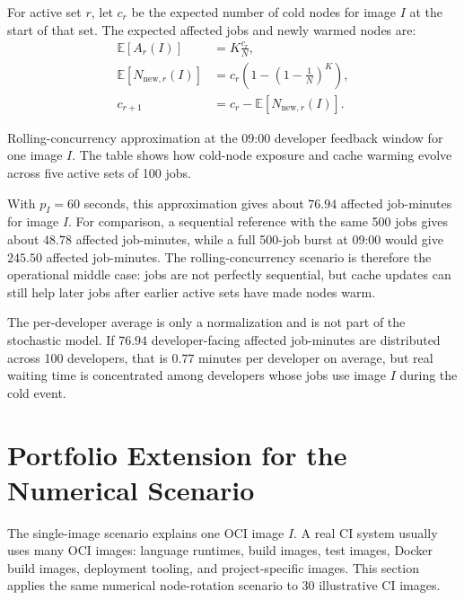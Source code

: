 \documentclass[11pt,a4paper]{article}
\newcommand{\E}{\mathbb{E}}
\begin{document}
For active set \(r\), let \(c_r\) be the expected number of cold nodes for image \(I\) at the start of that set. The expected affected jobs and newly warmed nodes are:
\begin{align}
  \E[A_r(I)] &= K\frac{c_r}{N},\\
  \E[N_{\mathrm{new},r}(I)] &= c_r\left(1-\left(1-\frac{1}{N}\right)^K\right),\\
  c_{r+1} &= c_r - \E[N_{\mathrm{new},r}(I)].
\end{align}

\begin{table}[H]
\centering
\caption{Rolling-concurrency approximation at the 09:00 developer feedback window for one image \(I\). The table shows how cold-node exposure and cache warming evolve across five active sets of 100 jobs.}
\label{tab:morningrolling}
\small
\begin{adjustbox}{max width=\linewidth}

\end{adjustbox}
\end{table}

With \(p_I=60\) seconds, this approximation gives about \(76.94\) affected job-minutes for image \(I\). For comparison, a sequential reference with the same 500 jobs gives about \(48.78\) affected job-minutes, while a full 500-job burst at 09:00 would give \(245.50\) affected job-minutes. The rolling-concurrency scenario is therefore the operational middle case: jobs are not perfectly sequential, but cache updates can still help later jobs after earlier active sets have made nodes warm.

The per-developer average is only a normalization and is not part of the stochastic model. If \(76.94\) developer-facing affected job-minutes are distributed across 100 developers, that is \(0.77\) minutes per developer on average, but real waiting time is concentrated among developers whose jobs use image \(I\) during the cold event.

\section{Portfolio Extension for the Numerical Scenario}\label{sec:multi-image}

The single-image scenario explains one OCI image \(I\). A real CI system usually uses many OCI images: language runtimes, build images, test images, Docker build images, deployment tooling, and project-specific images. This section applies the same numerical node-rotation scenario to 30 illustrative CI images.
\end{document}
